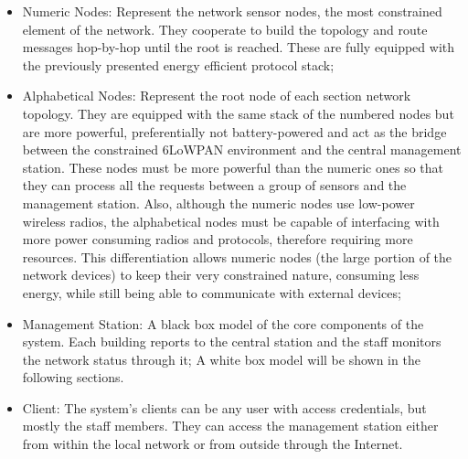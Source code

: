 \documentclass{sig-alternate-05-2015}
\begin{document}
\begin{itemize}
	\item Numeric Nodes: Represent the network sensor nodes, the most constrained element of the network. 
	They cooperate to build the topology and route messages hop-by-hop until the root is reached. 
	These are fully equipped with the previously presented energy efficient protocol stack;
	\item Alphabetical Nodes: Represent the root node of each section network topology.
	They are equipped with the same stack of the numbered nodes but are more powerful, preferentially not battery-powered and act as the bridge between the constrained 6LoWPAN environment and the central management station. 
	These nodes must be more powerful than the numeric ones so that they can process all the requests between a group of sensors and the management station. 
	Also, although the numeric nodes use low-power wireless radios, the alphabetical nodes must be capable of interfacing with more power consuming radios and protocols, therefore requiring more resources. 
	This differentiation allows numeric nodes (the large portion of the network devices) to keep their very constrained nature, consuming less energy, while still being able to communicate with external devices;
	\item Management Station: A black box model of the core components of the system. 
	Each building reports to the central station and the staff monitors the network status through it;
	A white box model will be shown in the following sections.
	\item Client: The system's clients can be any user with access credentials, but mostly the staff members. 
	They can access the management station either from within the local network or from outside through the Internet.
\end{itemize}
 
\end{document}
